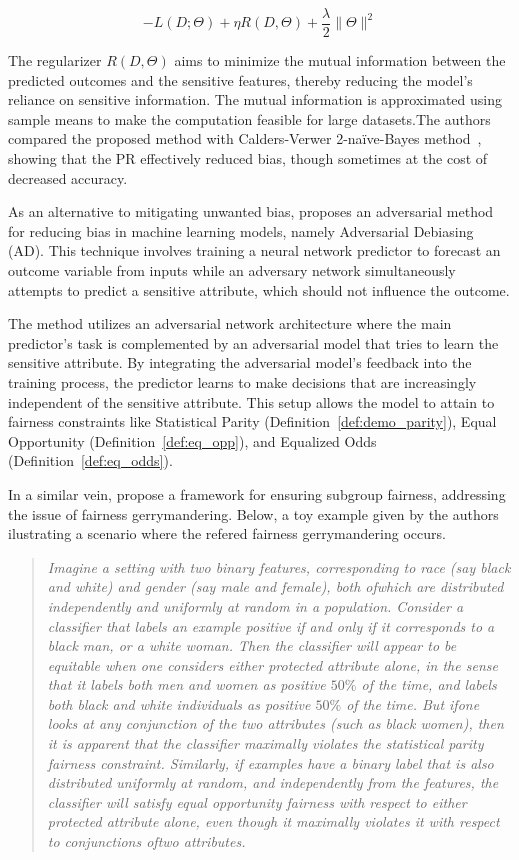 \begin{equation} \label{eq:prejudice_remover}
    -L(D;\Theta) + \eta R(D, \Theta) + \frac{\lambda}{2} \|\Theta\|^2
\end{equation}

The regularizer \( R(D, \Theta) \) aims to minimize the mutual information between the predicted outcomes and the sensitive features, thereby reducing the model's reliance on sensitive information. The mutual information is approximated using sample means to make the computation feasible for large datasets.The authors compared the proposed method with Calders-Verwer 2-naïve-Bayes method~\citep{Calders2010}, showing that the PR effectively reduced bias, though sometimes at the cost of decreased accuracy. 

As an alternative to mitigating unwanted bias, \cite{Zhang2018} proposes an adversarial method for reducing bias in machine learning models, namely Adversarial Debiasing (AD). This technique involves training a neural network predictor to forecast an outcome variable from inputs while an adversary network simultaneously attempts to predict a sensitive attribute, which should not influence the outcome. 

The method utilizes an adversarial network architecture where the main predictor's task is complemented by an adversarial model that tries to learn the sensitive attribute. By integrating the adversarial model’s feedback into the training process, the predictor learns to make decisions that are increasingly independent of the sensitive attribute. This setup allows the model to attain to fairness constraints like Statistical Parity (Definition~\ref{def:demo_parity}), Equal Opportunity (Definition~\ref{def:eq_opp}), and Equalized Odds (Definition~\ref{def:eq_odds}).

In a similar vein, \cite{kearns18a} propose a framework for ensuring subgroup fairness, addressing the issue of fairness gerrymandering. Below, a toy example given by the authors ilustrating a scenario where the refered fairness gerrymandering occurs.

\begin{quote}\textit{
Imagine a setting with two binary features, corresponding to race (say black and white) and gender (say male and female), both ofwhich are distributed independently and uniformly at random in a population. Consider a classiﬁer that labels an example positive if and only if it corresponds to a black man, or a white woman. Then the classiﬁer will appear to be equitable when one considers either protected attribute alone, in the sense that it labels both men and women as positive $50\%$ of the time, and labels both black and white individuals as positive $50\%$ of the time. But ifone looks at any conjunction of the two attributes (such as black women), then it is apparent that the classiﬁer maximally violates the statistical parity fairness constraint. Similarly, if examples have a binary label that is also distributed uniformly at random, and independently from the features, the classiﬁer will satisfy equal opportunity fairness with respect to either protected attribute alone, even though it maximally violates it with respect to conjunctions oftwo attributes.}
\end{quote}


